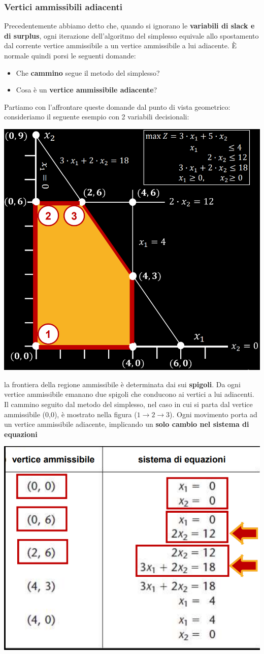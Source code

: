 \documentclass[12pt]{article}
\begin{document}
\subsubsection{Vertici ammissibili adiacenti}
Precedentemente abbiamo detto che, quando si ignorano le \textbf{variabili di slack e di surplus}, ogni iterazione dell'algoritmo del simplesso equivale allo spostamento dal corrente vertice ammissibile a un vertice ammissibile a lui adiacente.
È normale quindi porsi le seguenti domande:
\begin{itemize}
    \item Che \textbf{cammino} segue il metodo del simplesso?
    \item Cosa è un \textbf{vertice ammissibile adiacente}?
\end{itemize}
Partiamo con l'affrontare queste domande dal punto di vista geometrico:
consideriamo il seguente esempio con 2 variabili decisionali:
\begin{center}
    \includegraphics[width = 0.50\linewidth]{Images/36.png}
\end{center}
la frontiera della regione ammissibile è determinata dai sui \textbf{spigoli}.
Da ogni vertice ammissibile emanano due spigoli che conducono ai vertici a lui adiacenti.
Il cammino seguito dal metodo del simplesso, nel caso in cui si parta dal vertice ammissibile (0,0), è mostrato nella
figura ($1 \rightarrow 2 \rightarrow 3$). Ogni movimento porta ad un vertice ammissibile adiacente, implicando un \textbf{solo cambio nel sistema di equazioni}
\begin{center}
    \includegraphics[width = 0.50\linewidth]{Images/37.png}
\end{center}
\end{document}
